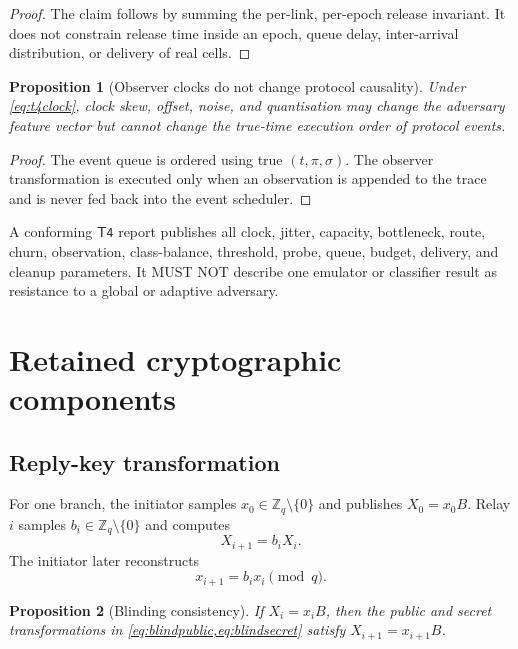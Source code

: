 \documentclass[11pt,oneside]{article}
\newcommand{\Zq}{\mathbb{Z}_q}
\newcommand{\Tfour}{\ensuremath{\mathsf{T4}}}
\newtheorem{proposition}{Proposition}
\begin{document}
\begin{proof}
The claim follows by summing the per-link, per-epoch release invariant. It does not constrain release time inside an epoch, queue delay, inter-arrival distribution, or delivery of real cells.
\end{proof}

\begin{proposition}[Observer clocks do not change protocol causality]
Under \eqref{eq:t4clock}, clock skew, offset, noise, and quantisation may change the adversary feature vector but cannot change the true-time execution order of protocol events.
\end{proposition}

\begin{proof}
The event queue is ordered using true $(t,\pi,\sigma)$. The observer transformation is executed only when an observation is appended to the trace and is never fed back into the event scheduler.
\end{proof}

A conforming \Tfour{} report publishes all clock, jitter, capacity, bottleneck, route, churn, observation, class-balance, threshold, probe, queue, budget, delivery, and cleanup parameters. It MUST NOT describe one emulator or classifier result as resistance to a global or adaptive adversary.


\section{Retained cryptographic components}
\label{sec:crypto}

\subsection{Reply-key transformation}

For one branch, the initiator samples $x_0\in\Zq\setminus\{0\}$ and publishes $X_0=x_0B$. Relay $i$ samples $b_i\in\Zq\setminus\{0\}$ and computes
\begin{equation}
X_{i+1}=b_iX_i.
\label{eq:blindpublic}
\end{equation}
The initiator later reconstructs
\begin{equation}
x_{i+1}=b_ix_i\pmod q.
\label{eq:blindsecret}
\end{equation}

\begin{proposition}[Blinding consistency]
If $X_i=x_iB$, then the public and secret transformations in \cref{eq:blindpublic,eq:blindsecret} satisfy $X_{i+1}=x_{i+1}B$.
\end{proposition}
\end{document}

